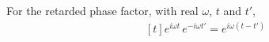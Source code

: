 \documentclass{article}
\begin{document}
For the retarded phase factor, with real $\omega$, $t$ and $t'$,
\begin{equation}
\begin{gathered}[t]
e^{i\omega t}\, e^{-i\omega t'} = e^{i\omega (t-t')}
\end{gathered}
\label{eq:g}
\end{equation}
\end{document}
